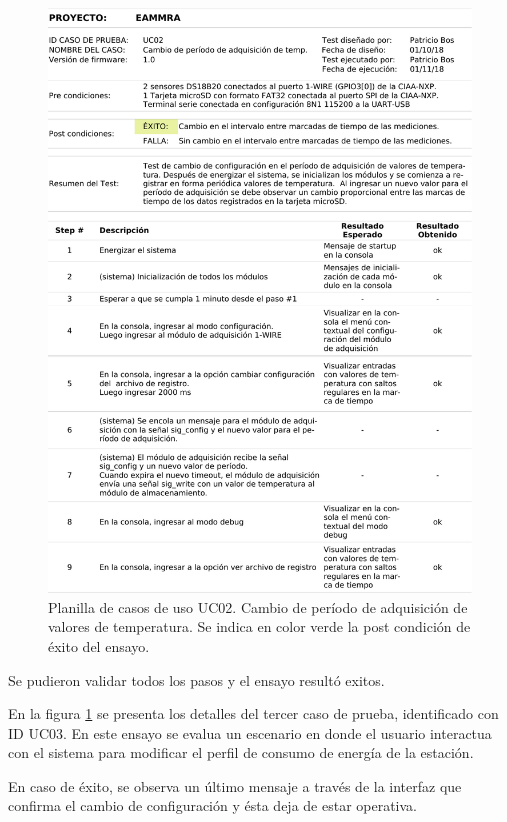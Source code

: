 \begin{figure}[!htb]
	\centering
	\includegraphics[width=1\textwidth]{./Figures/UseCase2.pdf}
	\caption{Planilla de casos de uso UC02.  Cambio de período de adquisición de valores de temperatura. Se indica en color verde la post condición de éxito del ensayo.}
	\label{fig:useCase2}
\end{figure}

Se pudieron validar todos los pasos y el ensayo resultó exitos.

En la figura \ref{fig:useCase2} se presenta los detalles del tercer caso de prueba, identificado con ID UC03.  En este ensayo se evalua un escenario en donde el usuario interactua con el sistema para modificar el perfil de consumo de energía de la estación. 

En caso de éxito, se observa un último mensaje a través de la interfaz que confirma el cambio de configuración y ésta deja de estar operativa.

